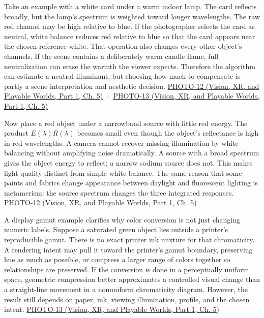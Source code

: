 Take an example with a white card under a warm indoor lamp. The card reflects broadly, but the lamp's spectrum is weighted toward longer wavelengths. The raw red channel may be high relative to blue. If the photographer selects the card as neutral, white balance reduces red relative to blue so that the card appears near the chosen reference white. That operation also changes every other object's channels. If the scene contains a deliberately warm candle flame, full neutralization can erase the warmth the viewer expects. Therefore the algorithm can estimate a neutral illuminant, but choosing how much to compensate is partly a scene interpretation and aesthetic decision. \href{../07-Vision-XR-and-Playable-Worlds-P01/main.pdf\#nameddest=04-visual-computing-ii-ch036-photo-12---photography-session-12}{PHOTO-12 (Vision, XR, and Playable Worlds, Part 1, Ch. 5)} · \href{../07-Vision-XR-and-Playable-Worlds-P01/main.pdf\#nameddest=04-visual-computing-ii-ch036-photo-13---photography-session-13}{PHOTO-13 (Vision, XR, and Playable Worlds, Part 1, Ch. 5)}

Now place a red object under a narrowband source with little red energy. The product \(E(\lambda)R(\lambda)\) becomes small even though the object's reflectance is high in red wavelengths. A camera cannot recover missing illumination by white balancing without amplifying noise dramatically. A source with a broad spectrum gives the object energy to reflect; a narrow sodium source does not. This makes light quality distinct from simple white balance. The same reason that some paints and fabrics change appearance between daylight and fluorescent lighting is metamerism: the source spectrum changes the three integrated responses. \href{../07-Vision-XR-and-Playable-Worlds-P01/main.pdf\#nameddest=04-visual-computing-ii-ch036-photo-12---photography-session-12}{PHOTO-12 (Vision, XR, and Playable Worlds, Part 1, Ch. 5)}

A display gamut example clarifies why color conversion is not just changing numeric labels. Suppose a saturated green object lies outside a printer's reproducible gamut. There is no exact printer ink mixture for that chromaticity. A rendering intent may pull it toward the printer's gamut boundary, preserving hue as much as possible, or compress a larger range of colors together so relationships are preserved. If the conversion is done in a perceptually uniform space, geometric compression better approximates a controlled visual change than a straight-line movement in a nonuniform chromaticity diagram. However, the result still depends on paper, ink, viewing illumination, profile, and the chosen intent. \href{../07-Vision-XR-and-Playable-Worlds-P01/main.pdf\#nameddest=04-visual-computing-ii-ch036-photo-13---photography-session-13}{PHOTO-13 (Vision, XR, and Playable Worlds, Part 1, Ch. 5)}

